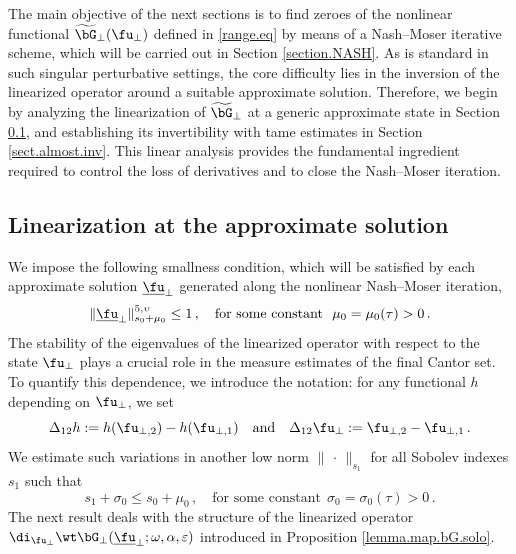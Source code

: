 \documentclass[a4paper,reqno,10pt]{article}
\begin{document}
The main objective of the next sections is to find zeroes of the nonlinear functional 
$\widetilde{\bG}_{\perp}(\fu_{\perp})$ defined in \eqref{range.eq} by means of a Nash–Moser iterative scheme, which will be carried out in Section \ref{section.NASH}. 
As is standard in such singular perturbative settings, the core difficulty lies in the inversion of the linearized operator around a suitable approximate solution. 
Therefore, we begin by analyzing the linearization of $\widetilde{\bG}_{\perp}$ at a generic approximate state in Section \ref{section.linear.eps}, and establishing its invertibility with tame estimates in Section \ref{sect.almost.inv}. 
This linear analysis provides the fundamental ingredient required to control the loss of derivatives and to close the Nash–Moser iteration.


\subsection{Linearization at the approximate solution}\label{section.linear.eps}
We impose the following smallness condition, which will be satisfied by each approximate solution $\underline{\fu}_{\perp}$ generated along the nonlinear Nash–Moser iteration,
\begin{equation}\label{ansatz.approx}
	\| \underline{\fu}_\perp \|_{s_0+\mu_{0}}^{5,\upsilon} \leq 1 \,, \quad \text{for some constant} \ \ \mu_{0}=\mu_{0}(\tau)>0 \,.
\end{equation}
The stability of the eigenvalues of the linearized operator with respect to the state $\fu_{\perp}$ plays a crucial role in the measure estimates of the final Cantor set. 
To quantify this dependence, we introduce the notation: for any functional $h$ depending on $\fu_{\perp}$, we set
\begin{equation}\label{Delta12}
    \Delta_{12} h := h(\fu_{\perp,2}) - h(\fu_{\perp,1})\quad\hbox{and}\quad \Delta_{12}\fu_{\perp}:=\fu_{\perp,2}-\fu_{\perp,1} \,.
\end{equation}
We estimate such variations in another low norm $\| \,\cdot\, \|_{s_1}$ for all Sobolev indexes $s_1$ such that
\begin{equation}\label{s1}
	s_1 + \sigma_{0} \leq s_0 + \mu_{0}\,, \quad \text{for some constant} \ \ \sigma_{0}=\sigma_{0}(\tau)>0 \,.
\end{equation}
The next result  deals with  the structure of the linearized operator $\di_{\fu_{\perp}}\wt\bG_{\perp}(\underline{\fu}_\perp;\omega,\alpha,\varepsilon)$ introduced in Proposition \ref{lemma.map.bG.solo}.
\end{document}
